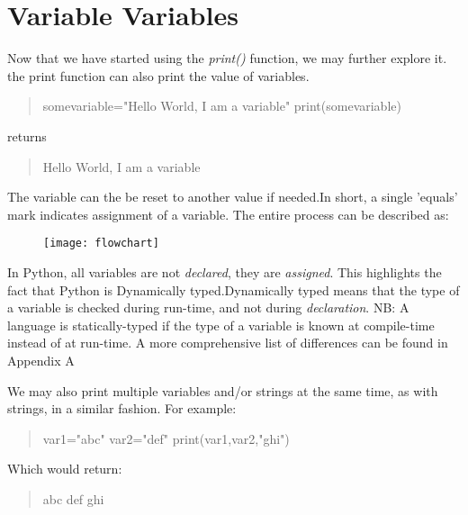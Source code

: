 \section{Variable Variables}
Now that we have started using the \emph{print()} function, we may further explore it.\newline 
the print function can also print the value of variables.
\begin{quote}
somevariable="Hello World, I am a variable"\newline 
print(somevariable)
\end{quote}
returns
\begin{quote}
Hello World, I am a variable
\end{quote}
The variable can the be reset to another value if needed.\newline  In short, a single 'equals' mark indicates assignment of a variable.\newline
The entire process can be described as: 
\begin{figure}[hbt]
\texttt{[image: flowchart]}
\end{figure}
\newline 
In Python, all variables are not \emph{declared}, they are \emph{assigned}. This highlights the fact that Python is Dynamically typed.\newline  Dynamically typed means that the type of a variable is checked during run-time, and not during \emph{declaration}. \newline  \newline  
NB: A language is statically-typed if the type of a variable is known at compile-time instead of at run-time. A more comprehensive list of differences can be found in Appendix A
\newline  \newline 

We may also print multiple variables and/or strings at the same time, as with strings, in a similar fashion. For example:
\begin{quote}
var1="abc"\newline 
var2="def"\newline 
print(var1,var2,"ghi")
\end{quote}

Which would return:
\begin{quote}
abc def ghi
\end{quote}

